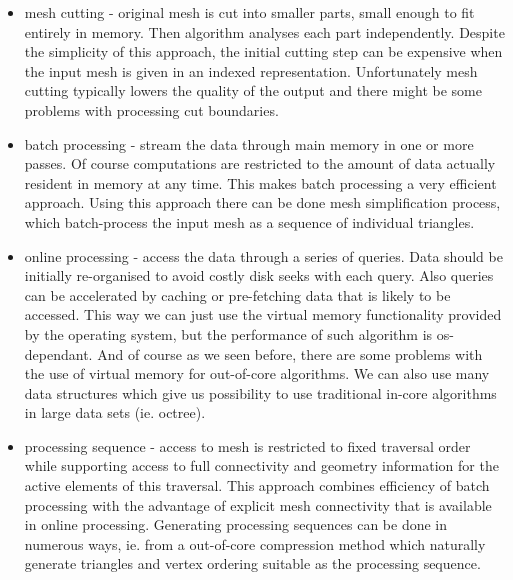 \begin{itemize}

    \item{mesh cutting} - original mesh is cut into smaller parts, small enough to fit entirely in memory.
	Then algorithm analyses each part independently.
	Despite the simplicity of this approach, the initial cutting step can be expensive when the input mesh is given in an indexed representation. 
	Unfortunately mesh cutting typically lowers the quality of the output and there might be some problems with processing cut boundaries.
	
    \item{batch processing} - stream the data through main memory in one or more passes.
	Of course computations are restricted to the amount of data actually resident in memory at any time.
	This makes batch processing a very efficient approach.
	Using this approach there can be done mesh simplification process, which batch-process the input mesh as a sequence of individual triangles.
	
    \item{online processing} - access the data through a series of queries.
	Data should be initially re-organised to avoid costly disk seeks with each query.
	Also queries can be accelerated by caching or pre-fetching data that is likely to be accessed.
	This way we can just use the virtual memory functionality provided by the operating system, but the performance of such algorithm is os-dependant.
	And of course as we seen before, there are some problems with the use of virtual memory for out-of-core algorithms.
	We can also use many data structures which give us possibility to use traditional in-core algorithms in large data sets (ie. octree).
	
    \item{processing sequence} - access to mesh is restricted to fixed traversal order while supporting access to full connectivity and geometry information for the active elements of this traversal.
	This approach combines efficiency of batch processing with the advantage of explicit mesh connectivity that is available in online processing.
	Generating processing sequences can be done in numerous ways, ie. from a out-of-core compression method which naturally generate triangles and vertex ordering suitable as the processing sequence.

\end{itemize}
\bigskip

